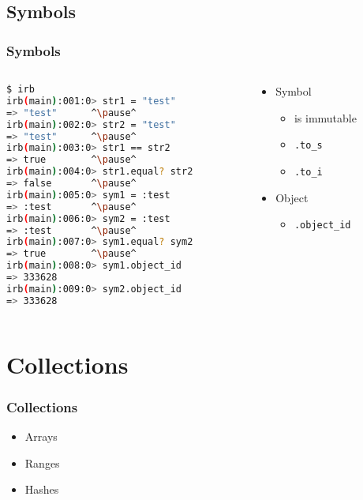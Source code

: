 \subsection{Symbols}
\begin{frame}[fragile]\frametitle{Symbols}

\begin{columns}[c] 

\begin{column}{7.5cm}
\begin{lstlisting}[language=bash, escapechar={^}]
$ irb
irb(main):001:0> str1 = "test"
=> "test"      ^\pause^
irb(main):002:0> str2 = "test"
=> "test"      ^\pause^
irb(main):003:0> str1 == str2
=> true        ^\pause^
irb(main):004:0> str1.equal? str2
=> false       ^\pause^
irb(main):005:0> sym1 = :test
=> :test       ^\pause^
irb(main):006:0> sym2 = :test
=> :test       ^\pause^
irb(main):007:0> sym1.equal? sym2
=> true        ^\pause^
irb(main):008:0> sym1.object_id
=> 333628
irb(main):009:0> sym2.object_id
=> 333628
\end{lstlisting}
\end{column}

\pause

\begin{column}{4cm}
\begin{itemize}

\item Symbol
\begin{itemize}
\item is immutable
\item \texttt{.to\_s}
\item \texttt{.to\_i}
\end{itemize}

\item Object
\begin{itemize}
\item \texttt{.object\_id}
\end{itemize}


\end{itemize}
\end{column}

\end{columns}

\end{frame}





\section{Collections} 
\begin{frame}\frametitle{Collections} 
\begin{itemize}
\item Arrays
\item Ranges
\item Hashes
\end{itemize}
\end{frame}




